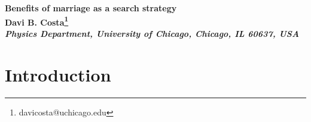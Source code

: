 \documentclass[12pt]{article}
\begin{document}
\baselineskip=18pt \pagestyle{plain} \setcounter{page}{1}


\begin{center}

{\Large \bf Benefits of marriage as a search strategy} \\ [9mm]



{\normalsize \bf Davi B. Costa\footnote[2]{davicosta@uchicago.edu} \\ [3mm]
{\small \it Physics Department, University of Chicago, Chicago, IL 60637, USA}}


\end{center}

\vspace*{0.2cm}


\begin{abstract}
We propose and investigate a model for marriage based on a stochastic matching process and simple behavioral rules. Agents have preferences that are determined by a probability distribution. They search for better mates at random, forming new couples and splitting up in the process. Marriage corresponds to the behavior of stopping searching for a better mate when the affinity between a couple exceeds a certain value. We show that the average utility in the system with marriage can be higher than in the system without it. To test the adequacy of our model to describe real societies, we compare the evolution of the fraction of married couples to real-world data and obtain good agreement. In the last section, we formulate the model in the limit of an infinite number of agents and find an analytical expression for the evolution of the system.
\end{abstract}



\newpage
\tableofcontents


\newpage
\section{Introduction}
\end{document}
